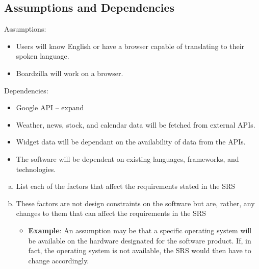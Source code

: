 \documentclass[]{article}
\begin{document}
\subsection{Assumptions and Dependencies}
\label{sub:assumptions_and_dependencies}
Assumptions:
\begin{itemize}
    \item Users will know English or have a browser capable of translating to their spoken language.
    \item Boardzilla will work on a browser.
\end{itemize}
Dependencies:
\begin{itemize}
    \item Google API -- expand
    \item Weather, news, stock, and calendar data will be fetched from external APIs.
    \item Widget data will be dependant on the availability of data from the APIs.
    \item The software will be dependent on existing languages, frameworks, and technologies.
\end{itemize}
\begin{enumerate}[a)]
  \item List each of the factors that affect the requirements stated in the SRS
  \item These factors are not design constraints on the software but are, rather, any changes to them that can affect the requirements in the SRS
  \begin{itemize}
    \item \textbf{Example}: An assumption may be that a specific operating system will be available on the hardware designated for the software product. If, in fact, the operating system is not available, the SRS would then have to change accordingly.
  \end{itemize}
\end{enumerate}
\end{document}
